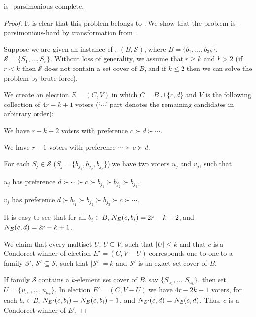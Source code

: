 \begin{theorem} \label{th:cddvc}
	 is \sharpPclass-parsimonious-complete.
\end{theorem}

\begin{proof}
It is clear that this problem belongs to \sharpPclass.
We show that the problem is \sharpPclass-parsimonious-hard by transformation from \sharpXthreeC.

Suppose we are given an instance of \sharpXthreeC, $(B,\mathcal{S})$, where $B=\{b_1,\dots,b_{3k}\}$, $\mathcal{S}=\{S_1,\dots,S_r\}$.
Without loss of generality, we assume that $r\ge k$ and $k>2$ (if $r<k$ then $\mathcal{S}$ does not contain a set cover of $B$, and if $k\le2$ then we can solve the problem by brute force).

We create an election $E=(C,V)$ in which $C=B\cup\{c,d\}$ and $V$ is the following collection of $4r-k+1$ voters (`$\cdots$' part denotes the remaining candidates in arbitrary order):
\begin{Enumerate}
    \item We have $r-k+2$ voters with preference $c\succ d\succ\cdots$.
	\item We have $r-1$ voters with preference $\cdots\succ c\succ d$.
	\item For each $S_j\in\mathcal{S}$ ($S_j=\{b_{j_1},b_{j_2},b_{j_3}\}$) we have two voters $u_j$ and $v_j$, such that
	\begin{Enumerate}
		\item $u_j$ has preference $d\succ\cdots\succ c\succ b_{j_1}\succ b_{j_2}\succ b_{j_3}$,
		\item $v_j$ has preference $d\succ b_{j_1}\succ b_{j_2}\succ b_{j_3}\succ c\succ\cdots$.
	\end{Enumerate}
\end{Enumerate}
It is easy to see that for all $b_i\in B$, $N_{E}(c,b_i)=2r-k+2$, and $N_{E}(c,d)=2r-k+1$.

We claim that every multiset $U$, $U\subseteq V$, such that $|U|\le k$ and that $c$ is a Condorcet winner of election $E'=(C,V-U)$ corresponds one-to-one to a family $\mathcal{S'}$, $\mathcal{S'}\subseteq\mathcal{S}$, such that $|\mathcal{S'}|=k$ and $\mathcal{S'}$ is an exact set cover of $B$.

If family $\mathcal{S}$ contains a $k$-element set cover of $B$, say $\{S_{a_1},\dots,S_{a_k}\}$, then set $U=\{u_{a_1},\dots,u_{a_k}\}$.
In election $E'=(C,V-U)$ we have $4r-2k+1$ voters, for each $b_i\in B$, $N_{E'}(c,b_i)=N_{E}(c,b_i)-1$, and $N_{E'}(c,d)=N_{E}(c,d)$.
Thus, $c$ is a Condorcet winner of $E'$.


\end{proof}
